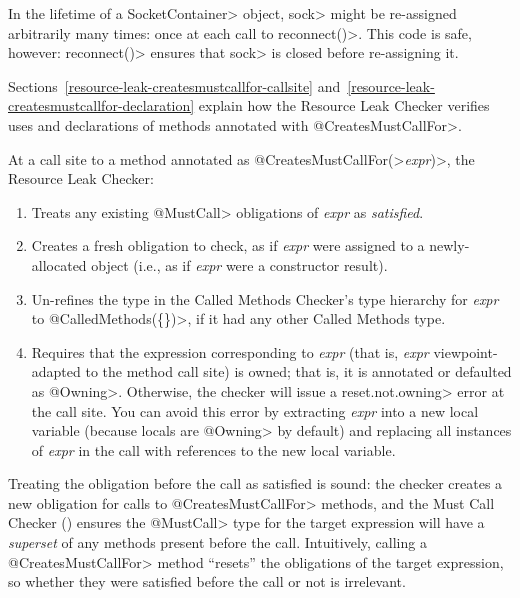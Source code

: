 In the lifetime of a \<SocketContainer> object, \<sock>
might be re-assigned arbitrarily many times: once at each
call to \<reconnect()>. This code is safe, however: \<reconnect()>
ensures that \<sock> is closed before re-assigning it.

Sections~\ref{resource-leak-createsmustcallfor-callsite}
and~\ref{resource-leak-createsmustcallfor-declaration}
explain how the Resource Leak Checker verifies uses and declarations of
methods annotated with \<@CreatesMustCallFor>.



At a call site to a method annotated as
\<@CreatesMustCallFor(>\emph{expr}\<)>, the Resource Leak Checker:
\begin{enumerate}
\item
  Treats any existing \<@MustCall> obligations of \emph{expr} as \emph{satisfied}.
\item
  Creates a fresh obligation to check, as if \emph{expr} were assigned to a newly-allocated
  object (i.e., as if \emph{expr} were a constructor result).
\item
  Un-refines the type in the Called Methods Checker's type hierarchy for \emph{expr} to
  \<@CalledMethods(\{\})>, if it had any other Called Methods type.
\item
  Requires that the expression corresponding to \emph{expr} (that is, \emph{expr}
  viewpoint-adapted to the method call site) is owned; that is, it is
  annotated or defaulted as \<@Owning>.  Otherwise, the checker
  will issue a \<reset.not.owning> error at the call site. You can avoid this
  error by extracting \emph{expr} into a new local variable (because
  locals are \<@Owning> by default) and replacing all instances of \emph{expr}
  in the call with references to the new local variable.
\end{enumerate}

Treating the obligation before the call as satisfied is sound: the
checker creates a new obligation for calls to \<@CreatesMustCallFor> methods,
and the Must Call Checker () ensures the
\<@MustCall> type for the target expression will have a \emph{superset} of any methods
present before the call. Intuitively, calling a \<@CreatesMustCallFor> method
``resets'' the obligations of the target expression, so whether they were satisfied before
the call or not is irrelevant.

